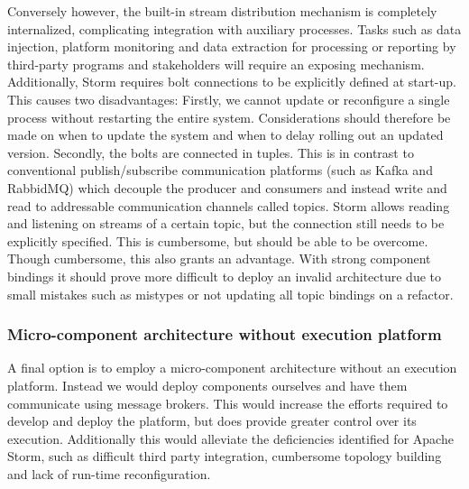 Conversely however, the built-in stream distribution mechanism is completely internalized, complicating integration with auxiliary processes. Tasks such as data injection, platform monitoring and data extraction for processing or reporting by third-party programs and stakeholders will require an exposing mechanism. Additionally, Storm requires bolt connections to be explicitly defined at start-up. This causes two disadvantages: Firstly, we cannot update or reconfigure a single process without restarting the entire system. Considerations should therefore be made on when to update the system and when to delay rolling out an updated version. Secondly, the bolts are connected in tuples. This is in contrast to conventional publish/subscribe communication platforms (such as Kafka and RabbidMQ) which decouple the producer and consumers and instead write and read to addressable communication channels called topics. Storm allows reading and listening on streams of a certain topic, but the connection still needs to be explicitly specified. This is cumbersome, but should be able to be overcome. Though cumbersome, this also grants an advantage. With strong component bindings it should prove more difficult to deploy an invalid architecture due to small mistakes such as mistypes or not updating all topic bindings on a refactor. 

\subsubsection*{Micro-component architecture without execution platform}
A final option is to employ a micro-component architecture without an execution platform. Instead we would deploy components ourselves and have them communicate using message brokers. This would increase the efforts required to develop and deploy the platform, but does provide greater control over its execution. Additionally this would alleviate the deficiencies identified for Apache Storm, such as difficult third party integration, cumbersome topology building and lack of run-time reconfiguration. 

